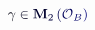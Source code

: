 \documentclass[12pt]{article}
\begin{document}
\makeatletter
\renewcommand*{\@textcolor}[3]{%
  \protect\leavevmode
  \begingroup
    \color#1{#2}#3%
  \endgroup
}
\makeatother
\begin{displaymath}
\mathcolor[RGB]{0,0,15}{\gamma} \mathcolor[RGB]{0,0,30}{\in} \mathbf { \mathcolor[RGB]{0,0,45}{M} } _ { \mathcolor[RGB]{0,0,60}{2} } \mathcolor[RGB]{0,0,75}{\left(} \mathcal { \mathcolor[RGB]{0,0,90}{O} } _ { \mathcolor[RGB]{0,0,105}{B} } \mathcolor[RGB]{0,0,120}{\right)}
\end{displaymath}
\end{document}

